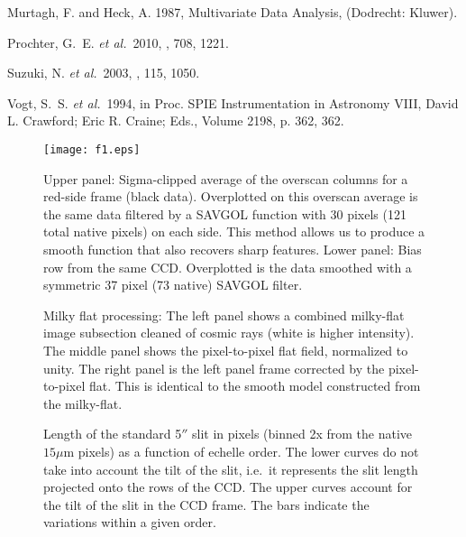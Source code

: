 \documentclass[12pt,preprint]{aastex}
\begin{document}
\begin{thebibliography}{}
{Murtagh}, F. and {Heck}, A. 1987, { {Multivariate Data Analysis}}, (Dodrecht:
  Kluwer).

{Prochter}, G.~E. {\it et al.}\  2010, \apj, 708, 1221.

{Suzuki}, N. {\it et al.}\  2003, \pasp, 115, 1050.

{Vogt}, S.~S. {\it et al.}\  1994, in { Proc. SPIE Instrumentation in Astronomy
  VIII, David L. Crawford; Eric R. Craine; Eds., Volume 2198, p. 362}, 362.

\end{thebibliography}


\clearpage 
%
%
%

\begin{figure}
\texttt{[image: f1.eps]}
\caption{Upper panel: Sigma-clipped average of the overscan columns
for a red-side frame (black data).  Overplotted on this overscan
average is the same data filtered by a SAVGOL function with 30 pixels
(121 total native pixels)
on each side.  This method allows us to produce a smooth function
that also recovers sharp features. %
Lower panel: Bias row from the same CCD.  Overplotted is the 
data smoothed with a symmetric 37 pixel (73 native) SAVGOL filter.
}
\label{fig:bias}
\end{figure}

\begin{figure}
\caption{Milky flat processing: The left panel shows a combined milky-flat
image subsection cleaned of cosmic rays (white is higher intensity).  The
middle panel shows the pixel-to-pixel flat field, normalized to unity.  The
right panel is the left panel frame corrected by the pixel-to-pixel flat.
This is identical to the smooth model constructed from the milky-flat. }
\label{fig:mflat}
\end{figure}

\begin{figure}
\caption{Length of the standard 5$''$ slit in pixels (binned 2x from the
native $15\mu$m pixels) as a function of echelle order.  The lower curves do
not take into account the tilt of the slit, i.e.\ it represents the slit
length projected onto the rows of the CCD.  The upper curves account
for the tilt of the slit in the CCD frame. 
The bars indicate the variations within a given order.
}
\label{fig:slitlen}
\end{figure}
\end{document}

